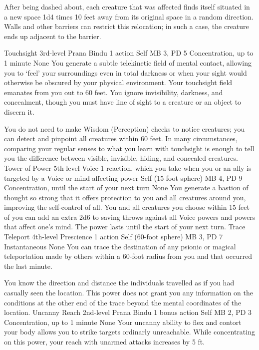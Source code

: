 After being dashed about, each creature that was affected
finds itself situated in a new space 1d4 times 10 feet away
from its original space in a random direction. Walls and other
barriers can restrict this relocation; in such a case, the
creature ends up adjacent to the barrier.

\DndPowerHeader%
    {Touchsight\label{pwr:touchsight}}
    {3rd-level Prana Bindu}
    {1 action}
    {Self}
    {MB 3, PD 5}
    {Concentration, up to 1 minute}
    {None}
You generate a subtle telekinetic field of
mental contact, allowing you to `feel' your surroundings
even in total darkness or when your sight would otherwise
be obscured by your physical environment. Your touchsight
field emanates from you out to 60 feet. You ignore invisibility,
darkness, and concealment, though you must have line of sight
to a creature or an object to discern it.

You do not need to make Wisdom (Perception) checks to notice
creatures; you can detect and pinpoint all creatures within
60 feet. In many circumstances, comparing your regular senses
to what you learn with touchsight is enough to tell you the
difference between visible, invisible, hiding, and concealed
creatures.
\DndPowerHeader%
    {Tower of Power\label{pwr:tower-of-power}}
    {5th-level Voice}
    {1 reaction, which you take when you or an ally is targeted by a Voice or mind-affecting power}
    {Self (15-foot sphere)}
    {MB 4, PD 9}
    {Concentration, until the start of your next turn}
    {None}
You generate a bastion of thought so strong
that it offers protection to you and all creatures around
you, improving the self-control of all. You and all creatures
you choose within 15 feet of you can add an extra 2d6 to saving
throws against all Voice powers and powers that affect one's
mind. The power lasts until the start of your next turn.
\DndPowerHeader%
    {Trace Teleport\label{pwr:trace-teleport}}
    {4th-level Prescience}
    {1 action}
    {Self (60-foot sphere)}
    {MB 3, PD 7}
    {Instantaneous}
    {None}
You can trace the destination of any psionic or magical
teleportation made by others within a 60-foot radius from
you and that occurred the last minute.

You know the direction and distance the individuals travelled
as if you had casually seen the location. This power does
not grant you any information on the conditions at the other
end of the trace beyond the mental coordinates of the location.
\DndPowerHeader%
    {Uncanny Reach\label{pwr:uncanny-reach}}
    {2nd-level Prana Bindu}
    {1 bonus action}
    {Self}
    {MB 2, PD 3}
    {Concentration, up to 1 minute}
    {None}
Your uncanny ability to flex and contort your body allows you
to strike targets ordinarly unreachable.
While concentrating on this power, your reach with unarmed attacks
increases by 5 ft.

